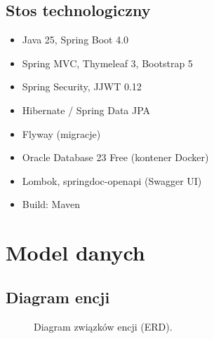 \documentclass[12pt,a4paper]{article}
\begin{document}
\subsection{Stos technologiczny}
\begin{itemize}[leftmargin=*]
  \item Java 25, Spring Boot 4.0
  \item Spring MVC, Thymeleaf 3, Bootstrap 5
  \item Spring Security, JJWT 0.12
  \item Hibernate / Spring Data JPA
  \item Flyway (migracje)
  \item Oracle Database 23 Free (kontener Docker)
  \item Lombok, springdoc-openapi (Swagger UI)
  \item Build: Maven
\end{itemize}

\section{Model danych}
\label{sec:model-danych}

\subsection{Diagram encji}
\begin{figure}[H]
  \centering
  \caption{Diagram związków encji (ERD).}
  \label{fig:erd}
\end{figure}
\end{document}
